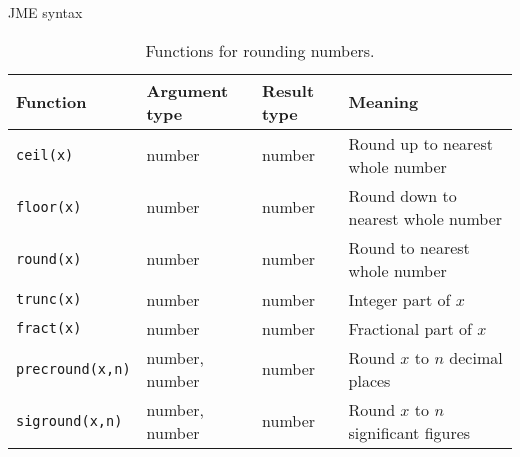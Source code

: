 \begin{chapter}{\label{cha:jme_syntax}JME syntax}
  \begin{sidewaystable}[ht]
  	\centering
  	\begin{tabular}{llll}
  		\hline
  		Function & Argument type & Result type & Meaning \\
  		\hline
  		\verb"ceil(x)" & number & number & Round up to nearest whole number \\
  		\verb"floor(x)" & number & number & Round down to nearest whole number \\
  		\verb"round(x)"	& number & number & Round to nearest whole number \\
  		\verb"trunc(x)" & number & number & Integer part of $x$ \\
  		\verb"fract(x)" & number & number & Fractional part of $x$ \\
      \verb"precround(x,n)" & number, number & number & Round $x$ to $n$
      decimal places \\
      \verb"siground(x,n)" & number, number & number & Round $x$ to $n$
      significant figures \\
  	\end{tabular}
  	\caption{\label{tab:roundingfunctions}
  		Functions for rounding numbers.
  	}
  \end{sidewaystable}


\end{chapter}
